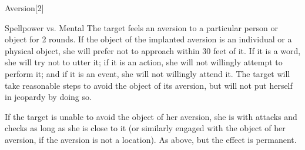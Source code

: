 \begin{spellsection}{Aversion}[2]
    \begin{spellheader}
    \end{spellheader}
    \begin{spellcontent}
        \begin{spelltargetinginfo}
        \end{spelltargetinginfo}
        \begin{spelleffects}
            \begin{spellattack}{Spellpower vs. Mental}
                \spellsuccess The target feels an aversion to a particular person or object for 2 rounds. If the object of the implanted aversion is an individual or a physical object, she will prefer not to approach within 30 feet of it. If it is a word, she will try not to utter it; if it is an action, she will not willingly attempt to perform it; and if it is an event, she will not willingly attend it. The target will take reasonable steps to avoid the object of its aversion, but will not put herself in jeopardy by doing so.
                \par If the target is unable to avoid the object of her aversion, she is \severelyimpaired with attacks and checks as long as she is close to it (or similarly engaged with the object of her aversion, if the aversion is not a location).
                \spellcritical As above, but the effect is permanent.
            \end{spellattack}
        \end{spelleffects}
    \end{spellcontent}
    \begin{spellfooter}
        \miscastrandom
    \end{spellfooter}
\end{spellsection}


